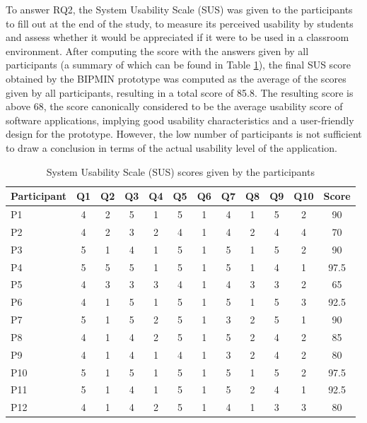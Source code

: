 To answer RQ2, the System Usability Scale (SUS) was given to the participants to fill out at the end of the study, to measure its perceived usability by students and assess whether it would be appreciated if it were to be used in a classroom environment. After computing the score with the answers given by all participants (a summary of which can be found in Table \ref{tab:sus}), the final SUS score obtained by the BIPMIN prototype was computed as the average of the scores given by all participants, resulting in a total score of 85.8. The resulting score is above 68, the score canonically considered to be the average usability score of software applications, implying good usability characteristics and a user-friendly design for the prototype. However, the low number of participants is not sufficient to draw a conclusion in terms of the actual usability level of the application.




\begin{table}[ht]
    \centering
    \caption{System Usability Scale (SUS) scores given by the participants}
    \begin{tabular}{lccccccccccc}
    \toprule
    \textbf{Participant} & \textbf{Q1} & \textbf{Q2} & \textbf{Q3} & \textbf{Q4} & \textbf{Q5} & \textbf{Q6} & \textbf{Q7} & \textbf{Q8} & \textbf{Q9} & \textbf{Q10} & \textbf{Score}\\
    \midrule
         P1 & 4 & 2 & 5 & 1 & 5 & 1 & 4 & 1 & 5 & 2 & 90 \\
         P2 & 4 & 2 & 3 & 2 & 4 & 1 & 4 & 2 & 4 & 4 & 70 \\
         P3 & 5 & 1 & 4 & 1 & 5 & 1 & 5 & 1 & 5 & 2 & 90 \\
         P4 & 5 & 5 & 5 & 1 & 5 & 1 & 5 & 1 & 4 & 1 & 97.5\\
         P5 & 4 & 3 & 3 & 3 & 4 & 1 & 4 & 3 & 3 & 2 & 65 \\
         P6 & 4 & 1 & 5 & 1 & 5 & 1 & 5 & 1 & 5 & 3 & 92.5\\
         P7 & 5 & 1 & 5 & 2 & 5 & 1 & 3 & 2 & 5 & 1 & 90 \\
         P8 & 4 & 1 & 4 & 2 & 5 & 1 & 5 & 2 & 4 & 2 & 85 \\
         P9 & 4 & 1 & 4 & 1 & 4 & 1 & 3 & 2 & 4 & 2 & 80 \\
         P10& 5 & 1 & 5 & 1 & 5 & 1 & 5 & 1 & 5 & 2 & 97.5\\
         P11& 5 & 1 & 4 & 1 & 5 & 1 & 5 & 2 & 4 & 1 & 92.5\\
         P12& 4 & 1 & 4 & 2 & 5 & 1 & 4 & 1 & 3 & 3 & 80 \\
    \bottomrule
    \end{tabular}
    \label{tab:sus}
\end{table}

